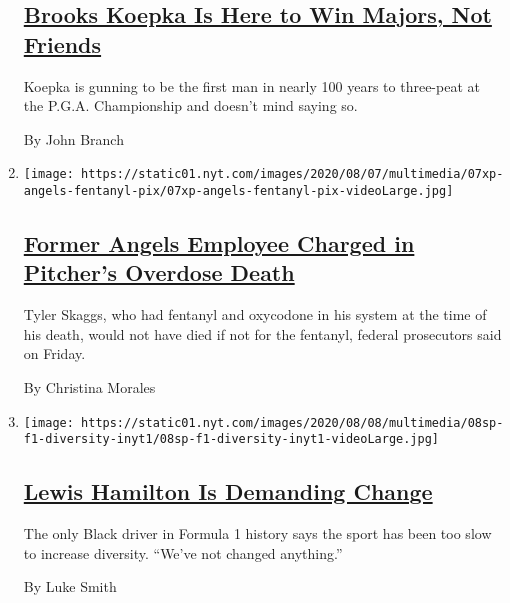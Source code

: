 \begin{enumerate}
{  \subsection{\texorpdfstring{\href{/2020/08/07/sports/brooks-koepka-pga-championship.html}{Brooks
  Koepka Is Here to Win Majors, Not
  Friends}}{Brooks Koepka Is Here to Win Majors, Not Friends}}\label{brooks-koepka-is-here-to-win-majors-not-friends}}

  Koepka is gunning to be the first man in nearly 100 years to
  three-peat at the P.G.A. Championship and doesn't mind saying so.

  By John Branch
\item
  \texttt{[image: https://static01.nyt.com/images/2020/08/07/multimedia/07xp-angels-fentanyl-pix/07xp-angels-fentanyl-pix-videoLarge.jpg]}

  \hypertarget{former-angels-employee-charged-in-pitchers-overdose-death}{%
  \subsection{\texorpdfstring{\href{/2020/08/07/sports/baseball/la-angels-fentanyl-tyler-skaggs.html}{Former
  Angels Employee Charged in Pitcher's Overdose
  Death}}{Former Angels Employee Charged in Pitcher's Overdose Death}}\label{former-angels-employee-charged-in-pitchers-overdose-death}}

  Tyler Skaggs, who had fentanyl and oxycodone in his system at the time
  of his death, would not have died if not for the fentanyl, federal
  prosecutors said on Friday.

  By Christina Morales
\item
  \texttt{[image: https://static01.nyt.com/images/2020/08/08/multimedia/08sp-f1-diversity-inyt1/08sp-f1-diversity-inyt1-videoLarge.jpg]}

  \hypertarget{lewis-hamilton-is-demanding-change}{%
  \subsection{\texorpdfstring{\href{/2020/08/07/sports/autoracing/lewis-hamilton-formula-1-diversity.html}{Lewis
  Hamilton Is Demanding
  Change}}{Lewis Hamilton Is Demanding Change}}\label{lewis-hamilton-is-demanding-change}}

  The only Black driver in Formula 1 history says the sport has been too
  slow to increase diversity. ``We've not changed anything.''

  By Luke Smith
\end{enumerate}


